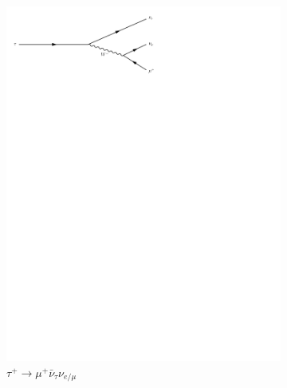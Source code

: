 \begin{figure}[h]
\begin{subfigure}[b]{0.3\textwidth}
    \includegraphics[trim={0.5cm 22cm 10cm 0cm},width=\textwidth]{../Diagrams/D5.pdf}
    \caption{$\tau^+\rightarrow \mu^+\bar{\nu}_{\tau}\nu_{e/\mu}$}
    \label{fey:5}
  \end{subfigure}%
  ~
  \begin{subfigure}[b]{0.3\textwidth}

\end{subfigure}
\end{figure}

